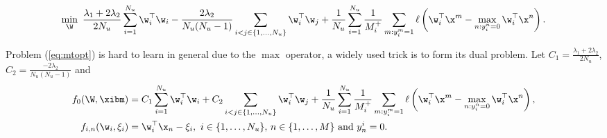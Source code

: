 \begin{equation}
\label{eq:mtopt}
\begin{aligned}
\min_{\W} \ \frac{\lambda_1 + 2\lambda_2}{2 N_u} \sum_{i=1}^{N_u} \w_i^\top \w_i 
- \frac{2\lambda_2}{N_u (N_u - 1)} \sum_{i < j \in \{1,\dots,N_u\}} \w_i^\top \w_j
+ \frac{1}{N_u} \sum_{i = 1}^{N_u} \frac{1}{M_i^+} \sum_{m: y_i^m = 1} \ell \left( \w_i^\top \x^m - \max_{n: y_i^n = 0} \w_i^\top \x^n \right).
\end{aligned}
\end{equation}

Problem (\ref{eq:mtopt}) is hard to learn in general due to the $\max$ operator,
a widely used trick is to form its dual problem.
Let $C_1 = \frac{\lambda_1 + 2\lambda_2}{2 N_u}$, $C_2 = \frac{-2\lambda_2}{N_u (N_u - 1)}$ and
\begin{equation*}
\begin{aligned}
f_0(\W, \xibm) &=  C_1 \sum_{i=1}^{N_u} \w_i^\top \w_i + C_2 \sum_{i < j \in \{1,\dots,N_u\}} \w_i^\top \w_j
    + \frac{1}{N_u} \sum_{i = 1}^{N_u} \frac{1}{M_i^+} \sum_{m: y_i^m = 1} \ell \left( \w_i^\top \x^m - \max_{n: y_i^n = 0} \w_i^\top \x^n \right), \\
f_{i,n}(\w_i, \xi_i) &= \w_i^\top \x_n - \xi_i, \ i \in \{1,\dots,N_u\}, \, n \in \{1,\dots,M\} \ \mathrm{and} \ y_n^i = 0.
\end{aligned}
\end{equation*}

